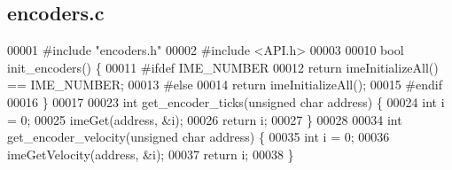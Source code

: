 \subsection{encoders.\+c}
\label{encoders_8c_source}

\begin{DoxyCode}
00001 \textcolor{preprocessor}{#include "encoders.h"}
00002 \textcolor{preprocessor}{#include <API.h>}
00003 
00010 \textcolor{keywordtype}{bool} init_encoders() \{
00011 \textcolor{preprocessor}{  #ifdef IME\_NUMBER}
00012   \textcolor{keywordflow}{return} imeInitializeAll() == IME_NUMBER;
00013 \textcolor{preprocessor}{  #else}
00014   \textcolor{keywordflow}{return} imeInitializeAll();
00015 \textcolor{preprocessor}{  #endif}
00016 \}
00017 
00023 \textcolor{keywordtype}{int} get_encoder_ticks(\textcolor{keywordtype}{unsigned} \textcolor{keywordtype}{char} address) \{
00024   \textcolor{keywordtype}{int} i = 0;
00025   imeGet(address, &i);
00026   \textcolor{keywordflow}{return} i;
00027 \}
00028 
00034 \textcolor{keywordtype}{int} get_encoder_velocity(\textcolor{keywordtype}{unsigned} \textcolor{keywordtype}{char} address) \{
00035   \textcolor{keywordtype}{int} i = 0;
00036   imeGetVelocity(address, &i);
00037   \textcolor{keywordflow}{return} i;
00038 \}
\end{DoxyCode}
